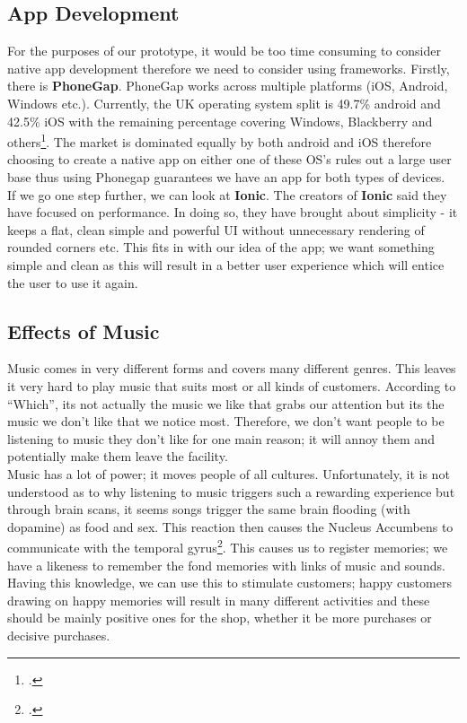 \subsection{App Development}
For the purposes of our prototype, it would be too time consuming to consider native app development therefore we need to consider using frameworks.  Firstly, there is \textbf{PhoneGap}.  PhoneGap works across multiple platforms (iOS, Android, Windows etc.).  Currently, the UK operating system split is 49.7\% android and 42.5\% iOS with the remaining percentage covering Windows, Blackberry and others\footcite{market-share}.  The market is dominated equally by both android and iOS therefore choosing to create a native app on either one of these OS's rules out a large user base thus using Phonegap guarantees we have an app for both types of devices.  \\
If we go one step further, we can look at \textbf{Ionic}.  The creators of \textbf{Ionic} said they have focused on performance.  In doing so, they have brought about simplicity - it keeps a flat, clean simple and powerful UI without unnecessary rendering of rounded corners etc.  This fits in with our idea of the app; we want something simple and clean as this will result in a better user experience which will entice the user to use it again.  

\subsection{Effects of Music}
Music comes in very different forms and covers many different genres.  This leaves it very hard to play music that suits most or all kinds of customers.  According to ``Which'', its not actually the music we like that grabs our attention but its the music we don't like that we notice most.   Therefore, we don't want people to be listening to music they don't like for one main reason; it will annoy them and potentially make them leave the facility.  \\

Music has a lot of power; it moves people of all cultures.  Unfortunately, it is not understood as to why listening to music triggers such a rewarding experience but through brain scans, it seems songs trigger the same brain flooding (with dopamine) as food and sex.  This reaction then causes the Nucleus Accumbens to communicate with the temporal gyrus\footcite{love-music}.  This causes us to register memories; we have a likeness to remember the fond memories with links of music and sounds.  Having this knowledge, we can use this to stimulate customers; happy customers drawing on happy memories will result in many different activities and these should be mainly positive ones for the shop, whether it be more purchases or decisive purchases.  \\

